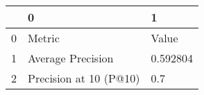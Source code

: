 \begin{tabular}{lll}
\toprule
{} &                       0 &         1 \\
\midrule
0 &                  Metric &     Value \\
1 &       Average Precision &  0.592804 \\
2 &  Precision at 10 (P@10) &       0.7 \\
\bottomrule
\end{tabular}
